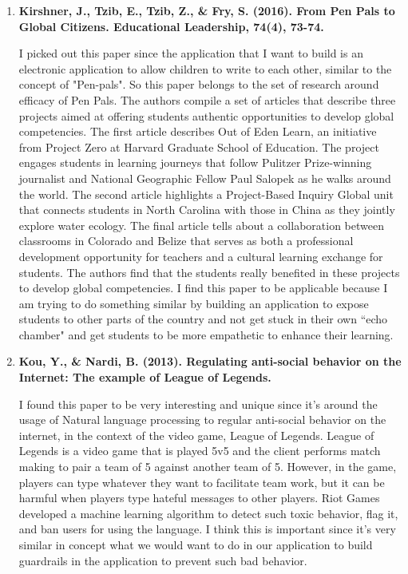 \documentclass[12pt, final]{article}
\begin{document}
\begin{enumerate}
\item \textbf{Kirshner, J., Tzib, E., Tzib, Z., \& Fry, S. (2016). From Pen Pals to Global Citizens. Educational Leadership, 74(4), 73-74.}

I picked out this paper since the application that I want to build is an electronic application to allow children to write to each other, similar to the concept of "Pen-pals". So this paper belongs to the set of research around efficacy of Pen Pals. The authors compile a set of articles that describe three projects aimed at offering students authentic opportunities to develop global competencies. The first article describes Out of Eden Learn, an initiative from Project Zero at Harvard Graduate School of Education. The project engages students in learning journeys that follow Pulitzer Prize-winning journalist and National Geographic Fellow Paul Salopek as he walks around the world. The second article highlights a Project-Based Inquiry Global unit that connects students in North Carolina with those in China as they jointly explore water ecology. The final article tells about a collaboration between classrooms in Colorado and Belize that serves as both a professional development opportunity for teachers and a cultural learning exchange for students. The authors find that the students really benefited in these projects to develop global competencies. I find this paper to be applicable because I am trying to do something similar by building an application to expose students to other parts of the country and not get stuck in their own ``echo chamber" and get students to be more empathetic to enhance their learning.

\item \textbf{Kou, Y., \& Nardi, B. (2013). Regulating anti-social behavior on the Internet: The example of League of Legends.}

I found this paper to be very interesting and unique since it's around the usage of Natural language processing to regular anti-social behavior on the internet, in the context of the video game, League of Legends. League of Legends is a video game that is played 5v5 and the client performs match making to pair a team of 5 against another team of 5. However, in the game, players can type whatever they want to facilitate team work, but it can be harmful when players type hateful messages to other players. Riot Games developed a machine learning algorithm to detect such toxic behavior, flag it, and ban users for using the language. I think this is important since it's very similar in concept what we would want to do in our application to build guardrails in the application to prevent such bad behavior. 


\end{enumerate}
\end{document}
